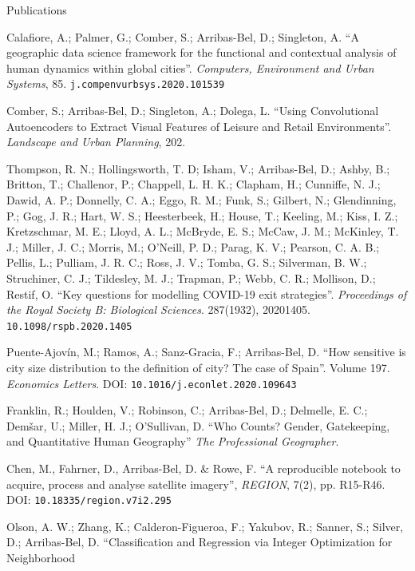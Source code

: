 \documentclass[12pt,2up]{article}
\begin{document}
\begin{cv}{}
\begin{cvlist}{Publications}
\item[] Calafiore, A.; Palmer, G.; Comber, S.; Arribas-Bel, D.; Singleton, A.
        ``A geographic data science framework for the functional and
        contextual analysis of human dynamics within global cities''.
        \emph{Computers, Environment and Urban Systems}, 85.
        \texttt{j.compenvurbsys.2020.101539}
\item[\textit{2020}]
    Comber, S.; Arribas-Bel, D.; Singleton, A.; Dolega, L.
    ``Using Convolutional Autoencoders to Extract Visual Features of Leisure
    and Retail Environments''.
    \emph{Landscape and Urban Planning}, 202.
\item[]
    Thompson, R. N.; Hollingsworth, T. D; Isham, V.;
    Arribas-Bel, D.; Ashby, B.; Britton, T.; Challenor, P.;
    Chappell, L. H. K.; Clapham, H.; Cunniffe, N. J.;
    Dawid, A. P.; Donnelly, C. A.; Eggo, R. M.; Funk,
    S.; Gilbert, N.; Glendinning, P.; Gog, J. R.;
    Hart, W. S.; Heesterbeek, H.; House, T.; Keeling, M.;
    Kiss, I. Z.; Kretzschmar, M. E.; Lloyd, A. L.;
    McBryde, E. S.; McCaw, J. M.; McKinley, T. J.; Miller,
    J. C.; Morris, M.; O'Neill, P. D.; Parag, K. V.;
    Pearson, C. A. B.; Pellis, L.; Pulliam, J. R. C.; Ross,
    J. V.; Tomba, G. S.; Silverman, B. W.;
    Struchiner, C. J.; Tildesley, M. J.; Trapman, P.;
    Webb, C. R.; Mollison, D.; Restif, O.
    ``Key questions for modelling COVID-19 exit strategies''.
    \emph{Proceedings of the Royal Society B: Biological Sciences}.
    287(1932), 20201405. \texttt{10.1098/rspb.2020.1405}
\item[]
     Puente-Ajov\'{i}n, M.; Ramos, A.; Sanz-Gracia, F.; Arribas-Bel, D.
     ``How sensitive is city size distribution to the definition of city? The
     case of Spain''. Volume 197.
     \emph{Economics Letters}. DOI: \texttt{10.1016/j.econlet.2020.109643}
\item[] Franklin, R.; Houlden, V.; Robinson, C.; Arribas-Bel, D.; Delmelle,
    E. C.; Dem\v{s}ar, U.; Miller, H. J.; O'Sullivan, D.
    ``Who Counts? Gender, Gatekeeping, and Quantitative Human Geography''
    \emph{The Professional Geographer}.
\item[] Chen, M., Fahrner, D., Arribas-Bel, D. \& Rowe, F. ``A reproducible
    notebook to acquire, process and analyse satellite imagery'',
    \emph{REGION},
    7(2), pp. R15-R46. DOI: \texttt{10.18335/region.v7i2.295}
\item[] 
    Olson, A. W.; Zhang, K.; Calderon-Figueroa, F.; Yakubov, R.; Sanner, S.;
    Silver, D.; Arribas-Bel, D.
    ``Classification and Regression via Integer Optimization for Neighborhood

\end{cvlist}
\end{cv}
\end{document}

